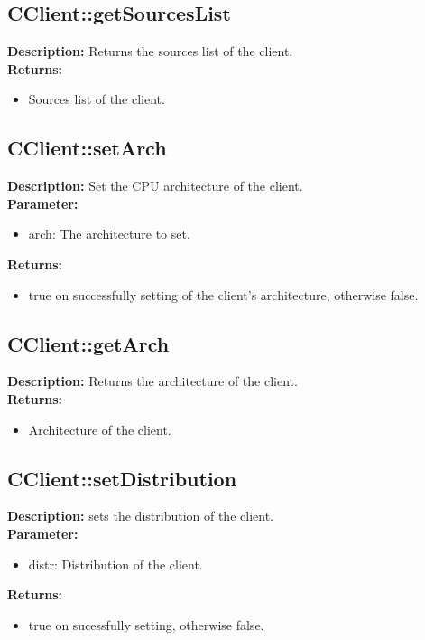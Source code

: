 \subsection{CClient::getSourcesList}
\textbf{Description:} Returns the sources list of the client.\\
\textbf{Returns:}
\begin{itemize}
\item Sources list of the client.
\end{itemize}

\subsection{CClient::setArch}
\textbf{Description:} Set the CPU architecture of the client.\\
\textbf{Parameter:}
\begin{itemize}
\item arch: The architecture to set.
\end{itemize}
\textbf{Returns:}
\begin{itemize}
\item true on successfully setting of the client's architecture, otherwise false.
\end{itemize}

\subsection{CClient::getArch}
\textbf{Description:} Returns the architecture of the client.\\
\textbf{Returns:}
\begin{itemize}
\item Architecture of the client.
\end{itemize}

\subsection{CClient::setDistribution}
\textbf{Description:} sets the distribution of the client.\\
\textbf{Parameter:}
\begin{itemize}
\item distr: Distribution of the client.
\end{itemize}
\textbf{Returns:}
\begin{itemize}
\item true on sucessfully setting, otherwise false.
\end{itemize}

